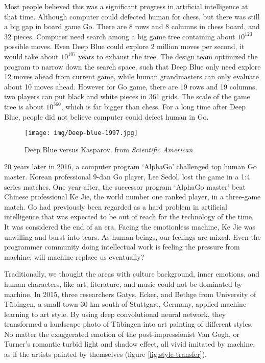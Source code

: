 \documentclass[b5paper]{article}
\begin{document}
Most people believed this was a significant progress in artificial intelligence at that time. Although computer could defected human for chess, but there was still a big gap in board game Go. There are 8 rows and 8 columns in chess board, and 32 pieces. Computer need search among a big game tree containing about $10^{123}$ possible moves. Even Deep Blue could explore 2 million moves per second, it would take about $10^{107}$ years to exhaust the tree. The design team optimized the program to narrow down the search space, such that Deep Blue only need explore 12 moves ahead from current game, while human grandmasters can only evaluate about 10 moves ahead. However for Go game, there are 19 rows and 19 columns, two players can put black and white pieces in 361 grids. The scale of the game tree is about $10^{360}$, which is far bigger than chess. For a long time after Deep Blue, people did not believe computer could defect human in Go.

\begin{figure}[htbp]
 \centering
 \texttt{[image: img/Deep-blue-1997.jpg]}
 \captionsetup{labelformat=empty}
 \caption{Deep Blue versus Kasparov. from {\em Scientific American}}
 \label{fig:Deep-blue-1997}
\end{figure}

20 years later in 2016, a computer program `AlphaGo' challenged top human Go master. Korean professional 9-dan Go player, Lee Sedol, lost the game in a 1:4 series matches. One year after, the successor program `AlphaGo master' beat Chinese professional Ke Jie, the world number one ranked player, in a three-game match. Go had previously been regarded as a hard problem in artificial intelligence that was expected to be out of reach for the technology of the time. It was considered the end of an era. Facing the emotionless machine, Ke Jie was unwilling and burst into tears. As human beings, our feelings are mixed. Even the programmer community doing intellectual work is feeling the pressure from machine: will machine replace us eventually?

Traditionally, we thought the areas with culture background, inner emotions, and human characters, like art, literature, and music could not be dominated by machine. In 2015, three researchers Gatys, Ecker, and Bethge from University of Tübingen, a small town 30 km south of Stuttgart, Germany, applied machine learning to art style. By using deep convolutional neural network, they transformed a landscape photo of Tübingen into art painting of different styles\cite{Gatys-2015}. No matter the exaggerated emotion of the post-impressionist Van Gogh, or Turner's romantic turbid light and shadow effect, all vivid imitated by machine, as if the artists painted by themselves (figure \cref{fig:style-transfer}).
\end{document}
